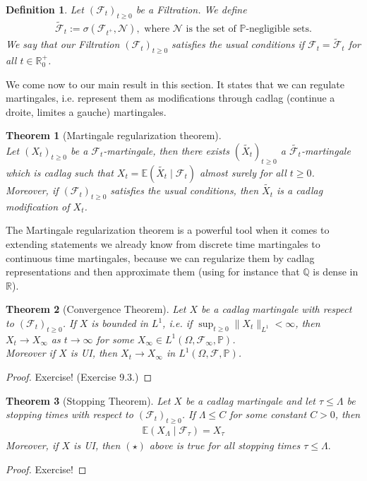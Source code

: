 \documentclass[11pt,a4paper, final]{article}
\newtheorem{thm}{Theorem}[section]
\newtheorem{defn}{Definition}[section]
\theoremstyle{definition}
\begin{document}
\begin{defn} Let $(\mathcal{F}_t)_{t \geq 0}$ be a Filtration. We define
\begin{align*}
\tilde{\mathcal{F}}_t := \sigma ( \mathcal{F}_{t^+}, \mathcal{N}), \text{ where } \mathcal{N} \text{ is the set of $\mathbb{P}$-negligible sets}. 
\end{align*}
We say that our Filtration $( \mathcal{F}_t)_{t \geq 0}$ satisfies the usual conditions if $\mathcal{F}_t = \tilde{\mathcal{F}}_t$ for all $t \in \mathbb{R}_0^+$.
\end{defn}
\noindent We come now to our main result in this section. It states that we can regulate martingales, i.e. represent them as modifications through cadlag (continue a droite, limites a gauche) martingales. 
\begin{thm}[Martingale regularization theorem] \ \\ Let $(X_t)_{t \geq 0}$ be a $ \mathcal{F}_t$-martingale, then there exists $(\widetilde{X_t})_{t \geq 0}$ a $\widetilde{\mathcal{F}_t}$-martingale which is cadlag such that $X_t = \mathbb{E}( \widetilde{X_t} \mid \mathcal{F}_t) $ almost surely for all $t \geq 0$. \\
Moreover, if $(\mathcal{F}_t)_{t \geq 0}$ satisfies the usual conditions, then $\widetilde{X_t}$ is a cadlag modification of $X_t$. 
\end{thm}
\newpage
\noindent The Martingale regularization theorem is a powerful tool when it comes to extending statements we already know from discrete time martingales to continuous time martingales, because we can regularize them by cadlag representations and then approximate them (using for instance that $\mathbb{Q}$ is dense in $\mathbb{R}$). 
\begin{thm}[Convergence Theorem] Let $X$ be a cadlag martingale with respect to $( \mathcal{F}_t)_{t \geq 0}$. If $X$ is bounded in $L^1$, i.e. if $\sup_{t \geq 0} \| X_t \|_{L^1} < \infty$, then $X_t \to X_\infty$ as $t \to \infty$ for some $X_\infty \in L^1( \Omega, \mathcal{F}_\infty, \mathbb{P})$. \\
Moreover if $X$ is UI, then $X_t \to X_\infty$ in $L^1( \Omega, \mathcal{F}, \mathbb{P})$. 
\end{thm}
\begin{proof}
Exercise! (Exercise 9.3.)
\end{proof}
\begin{thm}[Stopping Theorem] Let $X$ be a cadlag martingale and let $\tau \leq \Lambda$ be stopping times with respect to $( \mathcal{F}_t)_{t \geq 0}$. If $\Lambda \leq C$ for some constant $C >0$, then 
\begin{align*}
\mathbb{E}(X_\Lambda \mid \mathcal{F}_\tau ) = X_\tau \tag{$\star$}
\end{align*}
Moreover, if $X$ is UI, then $(\star)$ above is true for all stopping times $\tau \leq \Lambda.$ 
\end{thm}
\begin{proof}
Exercise!
\end{proof}
\newpage
\end{document}
